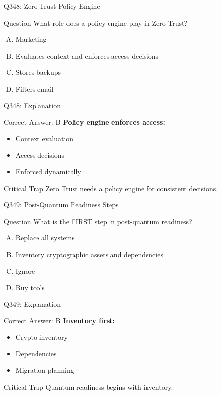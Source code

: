 \documentclass{beamer}
\begin{document}
	\begin{frame}{Q348: Zero-Trust Policy Engine}
		\begin{block}{Question}
			What role does a policy engine play in Zero Trust?
		\end{block}
		\begin{enumerate}[(A)]
			\item Marketing
			\item Evaluates context and enforces access decisions
			\item Stores backups
			\item Filters email
		\end{enumerate}
	\end{frame}
	
	\begin{frame}{Q348: Explanation}
		\begin{block}{Correct Answer: B}
			\textbf{Policy engine enforces access:}
			\begin{itemize}
				\item Context evaluation
				\item Access decisions
				\item Enforced dynamically
			\end{itemize}
		\end{block}
		\begin{alertblock}{Critical Trap}
			Zero Trust needs a policy engine for consistent decisions.
		\end{alertblock}
	\end{frame}
	
	\begin{frame}{Q349: Post-Quantum Readiness Steps}
		\begin{block}{Question}
			What is the FIRST step in post-quantum readiness?
		\end{block}
		\begin{enumerate}[(A)]
			\item Replace all systems
			\item Inventory cryptographic assets and dependencies
			\item Ignore
			\item Buy tools
		\end{enumerate}
	\end{frame}
	
	\begin{frame}{Q349: Explanation}
		\begin{block}{Correct Answer: B}
			\textbf{Inventory first:}
			\begin{itemize}
				\item Crypto inventory
				\item Dependencies
				\item Migration planning
			\end{itemize}
		\end{block}
		\begin{alertblock}{Critical Trap}
			Quantum readiness begins with inventory.
		\end{alertblock}
	\end{frame}
	
\end{document}
